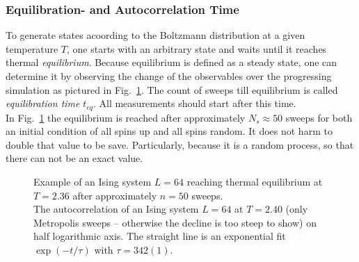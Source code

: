     \subsubsection{Equilibration- and Autocorrelation Time}
    \label{sssec:eqtime}
        To generate states acoording to the Boltzmann distribution at a
        given temperature \(T\), one starts with an arbitrary state
        and waits until it reaches thermal \emph{equilibrium}. Because
        equilibrium is defined as a steady state, one can determine it by
        observing the change of the observables over the progressing
        simulation as pictured in Fig.\ \ref{fig:equiandauto}.
        The count of sweeps till
        equilibrium is called \emph{equilibration time} \(t_{eq}\).
        All measurements should start after this time.\\
        In Fig.\ \ref{fig:equiandauto}
        the equilibrium is reached after approximately \(N_{s} \approx 50\) sweeps for
        both an initial condition of all spins up and all spins random. It
        does not harm to double that value to be save. Particularly, because
        it is a random process, so that there can not be an exact value.
        \begin{figure}[htbp]
            \centering
            \caption[Examples for Equilibration and Autocorrelation]
            {
                 Example of an Ising system
                    \(L=64\) reaching thermal equilibrium at \(T=2.36\) after
                    approximately \(n=50\) sweeps.\\
                 The autocorrelation of an
                    Ising system \(L=64\) at \(T=2.40\) (only Metropolis
                    sweeps -- otherwise the decline is too steep to show)
                    on half logarithmic axis.
                    The straight line is an exponential fit \(\exp(-t/\tau)\)
                    with \(\tau = 342(1)\).
            }
            \label{fig:equiandauto}
        \end{figure}\\
